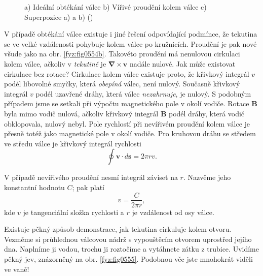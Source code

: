     \begin{figure}[ht!]
      \centering
      \caption{a) Ideální obtékání válce b) Vířivé proudění kolem válce c) Superpozice a) a b)
               (\cite[s.~752]{Feynman02})}
      \label{fyz:fig0554}
    \end{figure}
    
    V případě obtékání válce existuje i jiné řešení odpovídající podmínce, že tekutina se ve velké 
    vzdálenosti pohybuje kolem válce po kružnicích. Proudění je pak nové všude jako na obr. 
    \ref{fyz:fig0554b}. Takovéto proudění má nenulovou cirkulaci kolem válce, ačkoliv v 
    \emph{tekutině} je \(\symbf{\nabla}\times\bm{v}\) nadále nulové. Jak může existovat cirkulace 
    bez rotace? Cirkulace kolem válce existuje proto, že křivkový integrál \(v\) podél libovolné 
    smyčky, která \emph{obepíná} válec, není nulový. Současně křivkový integrál \(v\) podél 
    uzavřené dráhy, která válec \emph{nezahrnuje}, je nulový. S podobným případem jsme se setkali 
    při výpočtu magnetického pole v okolí vodiče. Rotace \(\bm{B}\) byla mimo vodič nulová, ačkoliv 
    křivkový integrál \(\bm{B}\) podél dráhy, která vodič obklopovala, nulový nebyl. Pole rychlostí 
    při nevířivém proudění kolem válce je přesně totéž jako magnetické pole v okolí vodiče. Pro 
    kruhovou dráhu se středem ve středu válce je křivkový integrál rychlosti
    \begin{equation*}
      \oint\bm{v}\cdot d\bm{s} = 2\pi r v.
    \end{equation*}
    
    V případě nevířivého proudění nesmí integrál záviset na \(r\). Nazvěme jeho konstantní hodnotu
    \(C\); pak platí
    \begin{equation}\label{fyz:eq566}
      v = \dfrac{C}{2\pi r},
    \end{equation}
    kde \(v\) je tangenciální složka rychlosti a \(r\) je vzdálenost od osy válce.
    
    Existuje pěkný způsob demonstrace, jak tekutina cirkuluje kolem otvoru. Vezměme si průhlednou 
    válcovou nádrž s vypouštěcím otvorem uprostřed jejího dna. Naplníme ji vodou, trochu ji 
    roztočíme a vytáhnete zátku z trubice. Uvidíme pěkný jev, znázorněný na obr. \ref{fyz:fig0555}. 
    Podobnou věc jste mnohokrát viděli ve vaně!
    
